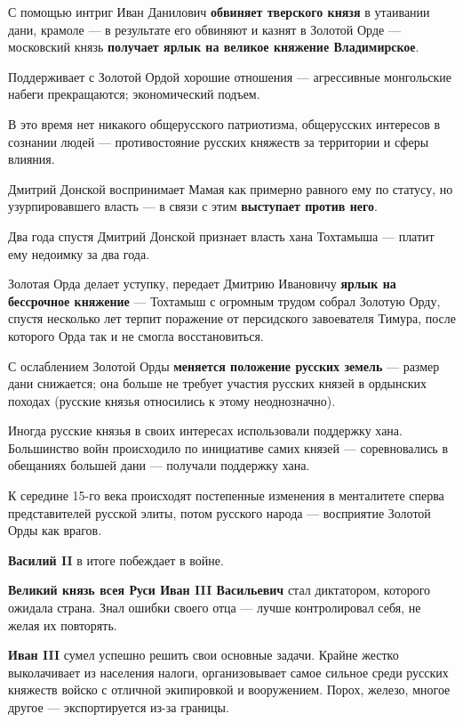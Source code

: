 \documentclass{article}
\begin{document}
С помощью интриг Иван Данилович \textbf{обвиняет тверского князя} в утаивании дани, крамоле — в результате его обвиняют и казнят в Золотой Орде — московский князь \textbf{получает ярлык на великое княжение Владимирское}.

Поддерживает с Золотой Ордой хорошие отношения — агрессивные монгольские набеги прекращаются; экономический подъем.

\hfill

В это время нет никакого общерусского патриотизма, общерусских интересов в сознании людей — противостояние русских княжеств за территории и сферы влияния.

\hfill

Дмитрий Донской воспринимает Мамая как примерно равного ему по статусу, но узурпировавшего власть — в связи с этим \textbf{выступает против него}.

Два года спустя Дмитрий Донской признает власть хана Тохтамыша — платит ему недоимку за два года.

Золотая Орда делает уступку, передает Дмитрию Ивановичу \textbf{ярлык на бессрочное княжение} — Тохтамыш с огромным трудом собрал Золотую Орду, спустя несколько лет терпит поражение от персидского завоевателя Тимура, после которого Орда так и не смогла восстановиться.

\hfill

С ослаблением Золотой Орды \textbf{меняется положение русских земель} — размер дани снижается; она больше не требует участия русских князей в ордынских походах (русские князья относились к этому неоднозначно).

Иногда русские князья в своих интересах использовали поддержку хана. Большинство войн происходило по инициативе самих князей — соревновались в обещаниях большей дани — получали поддержку хана.

\hfill

К середине 15-го века происходят постепенные изменения в менталитете сперва представителей русской элиты, потом русского народа — восприятие Золотой Орды как врагов.

\textbf{Василий II} в итоге побеждает в войне.

\textbf{Великий князь всея Руси Иван III Васильевич} стал диктатором, которого ожидала страна. Знал ошибки своего отца — лучше контролировал себя, не желая их повторять.

\hfill

\textbf{Иван III} сумел успешно решить свои основные задачи. Крайне жестко выколачивает из населения налоги, организовывает самое сильное среди русских княжеств войско с отличной экипировкой и вооружением. Порох, железо, многое другое — экспортируется из-за границы.
\end{document}

